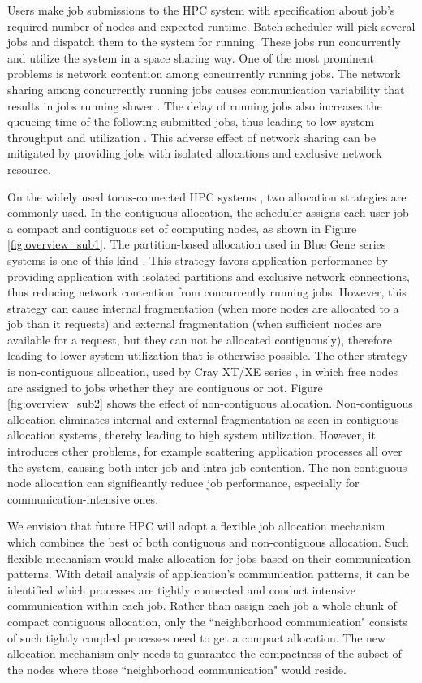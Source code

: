 \documentclass[conference]{IEEEtran}
\begin{document}
Users make job submissions to the HPC system with specification about job's required number of nodes and expected runtime. Batch scheduler will pick several jobs and dispatch them to the system for running. These jobs run concurrently and utilize the system in a space sharing way. One of the most prominent problems is network contention among concurrently running jobs. The network sharing among concurrently running jobs causes communication variability that results in jobs running slower \cite{abhinav-sc13}. The delay of running jobs also increases the queueing time of the following submitted jobs, thus leading to low system throughput and utilization \cite{jose-ipdps15}. This adverse effect of network sharing can be mitigated by providing jobs with isolated allocations and exclusive network resource. 

On the widely used torus-connected HPC systems \cite{bgq}\cite{tofu}\cite{titan}, two allocation strategies are commonly used. In the contiguous allocation, the scheduler assigns each user job a compact and contiguous set of computing nodes, as shown in Figure \ref{fig:overview_sub1}. The partition-based allocation used in Blue Gene series systems is one of this kind \cite{zhou-ipdps}. This strategy favors application performance by providing application with isolated partitions and exclusive network connections, thus reducing network contention from concurrently running jobs. However, this strategy can cause internal fragmentation (when more nodes are allocated to a job than it requests) and external fragmentation (when sufficient nodes are available for a request, but they can not be allocated contiguously), therefore leading to lower system utilization that is otherwise possible. The other strategy is non-contiguous allocation, used by Cray XT/XE series \cite{carl-cug}, in which free nodes are assigned to jobs whether they are contiguous or not. Figure \ref{fig:overview_sub2} shows the effect of non-contiguous allocation. Non-contiguous allocation eliminates internal and external fragmentation as seen in contiguous allocation systems, thereby leading to high system utilization. However, it introduces other problems, for example scattering application processes all over the system, causing both inter-job and intra-job contention. The non-contiguous node allocation can significantly reduce job performance, especially for communication-intensive ones.

We envision that future HPC will adopt a flexible job allocation mechanism which combines the best of both contiguous and non-contiguous allocation. Such flexible mechanism would make allocation for jobs based on their communication patterns. With detail analysis of application's communication patterns, it can be identified which processes are tightly connected and conduct intensive communication within each job. Rather than assign each job a whole chunk of compact contiguous allocation, only the ``neighborhood communication" consists of such tightly coupled processes need to get a compact allocation. The new allocation mechanism only needs to guarantee the compactness of the subset of the nodes where those ``neighborhood communication" would reside.
\end{document}
